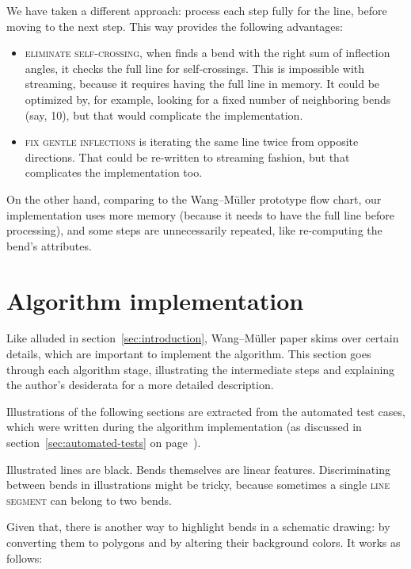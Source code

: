 \documentclass[a4paper]{article}
\newcommand{\onpage}[1]{\ref{#1} on page~\pageref{#1}}
\newcommand{\WM}{Wang--M{\"u}ller}
\begin{document}
We have taken a different approach: process each step fully for the line,
before moving to the next step. This way provides the following advantages:

\begin{itemize}

    \item \textsc{eliminate self-crossing}, when finds a bend with the right
        sum of inflection angles, it checks the full line for self-crossings.
        This is impossible with streaming, because it requires having the full
        line in memory. It could be optimized by, for example, looking for a
        fixed number of neighboring bends (say, 10), but that would complicate
        the implementation.

    \item \textsc{fix gentle inflections} is iterating the same line twice from
        opposite directions. That could be re-written to streaming fashion, but
        that complicates the implementation too.

\end{itemize}

On the other hand, comparing to the {\WM} prototype flow chart, our
implementation uses more memory (because it needs to have the full line before
processing), and some steps are unnecessarily repeated, like re-computing the
bend's attributes.

\section{Algorithm implementation}

Like alluded in section~\ref{sec:introduction}, {\WM} paper skims over
certain details, which are important to implement the algorithm. This section
goes through each algorithm stage, illustrating the intermediate steps and
explaining the author's desiderata for a more detailed description.

Illustrations of the following sections are extracted from the automated test
cases, which were written during the algorithm implementation (as discussed in
section~\onpage{sec:automated-tests}).

Illustrated lines are black. Bends themselves are linear features.
Discriminating between bends in illustrations might be tricky, because
sometimes a single \textsc{line segment} can belong to two bends.

Given that, there is another way to highlight bends in a schematic drawing: by
converting them to polygons and by altering their background colors. It works
as follows:
\end{document}
